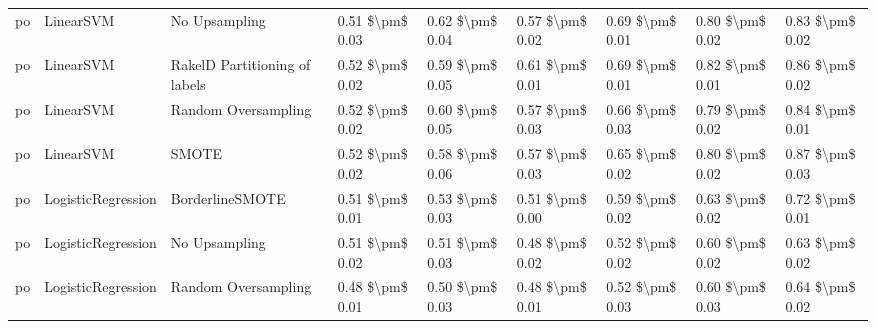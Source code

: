 \begin{tabular}{lllllllll}
      po &                       LinearSVM &                 No Upsampling &     0.51 \$\textbackslash pm\$ 0.03 &           0.62 \$\textbackslash pm\$ 0.04 &       0.57 \$\textbackslash pm\$ 0.02 &        0.69 \$\textbackslash pm\$ 0.01 &                         0.80 \$\textbackslash pm\$ 0.02 &     0.83 \$\textbackslash pm\$ 0.02 \\
      po &                       LinearSVM & RakelD Partitioning of labels &     0.52 \$\textbackslash pm\$ 0.02 &           0.59 \$\textbackslash pm\$ 0.05 &       0.61 \$\textbackslash pm\$ 0.01 &        0.69 \$\textbackslash pm\$ 0.01 &                         0.82 \$\textbackslash pm\$ 0.01 &     0.86 \$\textbackslash pm\$ 0.02 \\
      po &                       LinearSVM &           Random Oversampling &     0.52 \$\textbackslash pm\$ 0.02 &           0.60 \$\textbackslash pm\$ 0.05 &       0.57 \$\textbackslash pm\$ 0.03 &        0.66 \$\textbackslash pm\$ 0.03 &                         0.79 \$\textbackslash pm\$ 0.02 &     0.84 \$\textbackslash pm\$ 0.01 \\
      po &                       LinearSVM &                         SMOTE &     0.52 \$\textbackslash pm\$ 0.02 &           0.58 \$\textbackslash pm\$ 0.06 &       0.57 \$\textbackslash pm\$ 0.03 &        0.65 \$\textbackslash pm\$ 0.02 &                         0.80 \$\textbackslash pm\$ 0.02 &     0.87 \$\textbackslash pm\$ 0.03 \\
      po &              LogisticRegression &               BorderlineSMOTE &     0.51 \$\textbackslash pm\$ 0.01 &           0.53 \$\textbackslash pm\$ 0.03 &       0.51 \$\textbackslash pm\$ 0.00 &        0.59 \$\textbackslash pm\$ 0.02 &                         0.63 \$\textbackslash pm\$ 0.02 &     0.72 \$\textbackslash pm\$ 0.01 \\
      po &              LogisticRegression &                 No Upsampling &     0.51 \$\textbackslash pm\$ 0.02 &           0.51 \$\textbackslash pm\$ 0.03 &       0.48 \$\textbackslash pm\$ 0.02 &        0.52 \$\textbackslash pm\$ 0.02 &                         0.60 \$\textbackslash pm\$ 0.02 &     0.63 \$\textbackslash pm\$ 0.02 \\
      po &              LogisticRegression &           Random Oversampling &     0.48 \$\textbackslash pm\$ 0.01 &           0.50 \$\textbackslash pm\$ 0.03 &       0.48 \$\textbackslash pm\$ 0.01 &        0.52 \$\textbackslash pm\$ 0.03 &                         0.60 \$\textbackslash pm\$ 0.03 &     0.64 \$\textbackslash pm\$ 0.02 \\

\end{tabular}
